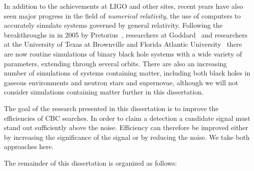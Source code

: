 In addition to the achievements at LIGO and other sites, recent years
have also seen major progress in the field of \emph{numerical
relativity}, the use of computers to accurately simulate systems
governed by general relativity.  Following the breakthroughs in in
2005 by Pretorius~\cite{Pretorius:2005gq}, researchers at
Goddard~\cite{Campanelli:2005dd} and researchers at the University of
Texas at Brownville and Florida Atlantic
University~\cite{Campanelli:2005dd} there are now routine simulations
of binary black hole systems with a wide variety of parameters,
extending through several orbits.  There are also an increasing number
of simulations of systems containing matter, including both black
holes in gaseous environments and neutron stars and supernovae,
although we will not consider simulations containing matter further in
this dissertation.


The goal of the research presented in this dissertation is to improve
the efficiencies of CBC searches.  In order to claim a detection a
candidate signal must stand out sufficiently above the noise.
Efficiency can therefore be improved either by increasing the
significance of the signal or by reducing the noise.  We take both
approaches here.

The remainder of this dissertation is organized as follows:

